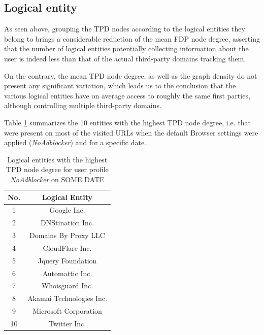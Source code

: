 \documentclass{sig-alternate}
\begin{document}
\subsection{Logical entity}
{\color{blue}
As seen above, grouping the TPD nodes according to the logical entities they belong to brings a considerable reduction of the mean FDP node degree, asserting that the number of logical entities potentially collecting information about the user is indeed less than that of the actual third-party domains tracking them.

On the contrary, the mean TPD node degree, as well as the graph density do not present any significant variation, which leads us to the conclusion that the various logical entities have on average access to roughly the same first parties, although controlling multiple third-party domains.

Table \ref{table:top_10_tpd_entities} summarizes the 10 entities with the highest TPD node degree, i.e. that were present on most of the visited URLs when the default Browser settings were applied (\textit{NoAdblocker}) and for a specific date.
}
\begin{table}
  \centering
  \begin{tabular}{|c|c|}
  \hline
  No. & Logical Entity \\
  \hline
  1 & Google Inc. \\
  2 & DNStination Inc. \\
  3 & Domains By Proxy LLC \\
  4 & CloudFlare Inc. \\
  5 & Jquery Foundation \\
  6 & Automattic Inc. \\
  7 & Whoisguard Inc. \\
  8 & Akamai Technologies Inc. \\
  9 & Microsoft Corporation \\
  10 & Twitter Inc. \\
  \hline
  \end{tabular}
  \caption{Logical entities with the highest TPD node degree for user profile \textit{NoAdblocker} on {\color{red} SOME DATE}}
  \label{table:top_10_tpd_entities}
  \end{table}
\end{document}
